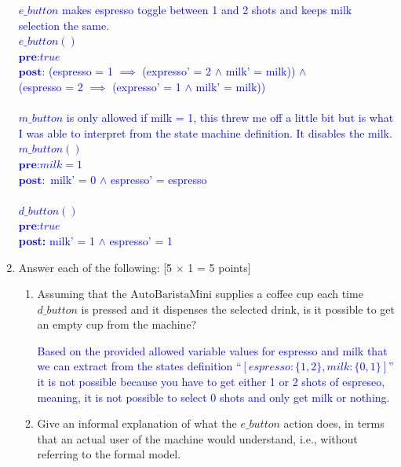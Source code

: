 \documentclass[12pt,fleqn]{article}
\begin{document}
\begin{enumerate}
\textcolor{blue}{
  $e\_button$ makes espresso toggle between 1 and 2 shots and keeps milk selection the same. \\
  $e\_button()$ \\
  $\textbf{pre:} true$  \\
  $\textbf{post:}$ (espresso = 1 $\implies$ (expresso' = 2 $\land$ milk' = milk)) $\land$ \\
                   (espresso = 2 $\implies$ (expresso' = 1 $\land$ milk' = milk)) \\
  \\
  $m\_button$ is only allowed if milk = 1, this threw me off a little bit but is what I was able to interpret from the state machine definition. It disables the milk.\\
  $m\_button()$ \\
  $\textbf{pre:} milk = 1$  \\
  $\textbf{post}:$ milk' = 0 $\land$ espresso' = espresso \\
  \\
  $d\_button()$ \\
  $\textbf{pre:} true$  \\
  \textbf{post:} milk' = 1 $\land$ espresso' = 1 \\}


\clearpage

\item Answer each of the following: [5 $\times$ 1 = 5 points]
\begin{enumerate}
\item Assuming that the $\mathrm{AutoBaristaMini}$ supplies a coffee cup each time $d\_button$ is pressed and it dispenses the selected drink, is it possible to get an empty cup from the machine?

\textcolor{blue}{Based on the provided allowed variable values for espresso and milk that we can extract from the states definition ``$[ espresso : \{ 1, 2 \}, milk : \{ 0, 1 \} ]$''  it is not possible because you have to get either 1 or 2 shots of espreseo, meaning, it is not possible to select 0 shots and only get milk or nothing. }  


\item Give an informal explanation of what the $e\_button$ action does, in terms that an actual user of the machine would understand, i.e., without referring to the formal model.


\end{enumerate}
\end{enumerate}
\end{document}

